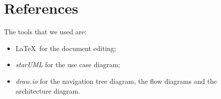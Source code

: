 \documentclass[12pt]{article}
\begin{document}
\section{References}\label{sec:ref}
The tools that we used are:
\begin{itemize}
    \item \LaTeX\ for the document editing;
    \item \textit{starUML} for the use case diagram;
    \item \textit{draw.io} for the navigation tree diagram, the flow diagrams and the architecture diagram.
\end{itemize}
\end{document}
